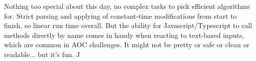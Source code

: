 Nothing too special about this day, no complex tasks to pick efficient algorithms for. Strict parsing and applying of constant-time modifications from start to finish, so linear run time overall. But the ability for Javascript/Typescript to call methods directly by name comes in handy when reacting to text-based inputs, which are common in AOC challenges. It might not be pretty or safe or clean or readable... but it's fun. ^^